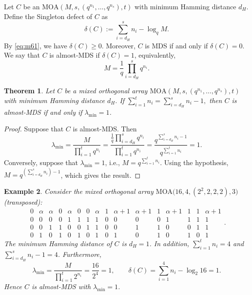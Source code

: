 \documentclass[11pt]{article}
\newtheorem{Theorem}{Theorem}[section]
\newtheorem{Example}[Theorem]{Example}
\newtheorem{Definition and Notation}[Theorem]{Definition and Notation}
\begin{document}
Let $C$ be an $\mathrm{MOA}(M,s,(q^{n_1},\dots,q^{n_s}),t)$ with minimum Hamming distance $d_H$. Define the Singleton defect of $C$ as
\begin{equation}
\delta(C) := \sum_{i=d_H}^s n_i - \log_q M.
\end{equation}
By \eqref{eq:m61}, we have $\delta(C)\ge 0$. Moreover, $C$ is MDS  if and only if $\delta(C) = 0$. We say that $C$ is almost-MDS if $\delta(C) = 1$, equivalently,
\begin{equation}
M = \frac{1}{q} \prod_{i=d_H}^{s} q^{n_i}.
\end{equation}

\begin{Theorem}\label{th:nearcon}
Let $C$ be a mixed orthogonal array $\mathrm{MOA}(M,s,(q^{n_1},\dots,q^{n_s}),t)$ with minimum Hamming distance $d_H$. If $ \sum_{i=1}^{t}n_i=\sum_{i=d_H}^{s}n_i-1,$ then $C$ is almost-MDS if and only if $\lambda_{\min}= 1$.
\end{Theorem}

\begin{proof}
Suppose that $C$ is almost-MDS. Then
$$
\lambda_{\min}=\frac{M}{\prod_{i=1}^{t} q^{n_i}}=\frac{\frac{1}{q} \prod_{i=d_H}^{s} q^{n_i}}{\prod_{i=1}^{t} q^{n_i}}=\frac{q^{\sum_{i=d_H}^{s}n_i-1}}{q^{\sum_{i=1}^{t}n_i}}=1.
$$
Conversely, suppose that $\lambda_{\min}=1$, i.e., $M=q^{\sum_{i=1}^{t}n_i}$. Using the hypothesis, $M = q^{(\sum_{i=d_H}^{s}n_i) - 1}$, which gives the result.
\end{proof}

\begin{Example}\label{ex:nearMDS}
Consider the mixed orthogonal array $\mathrm{MOA}\bigl(16,4,(2^2,2,2,2),3\bigr)$ (transposed):
$$
\begin{array}{cccccccccccccccc}
0 & \alpha & \alpha & 0 & \alpha & 0 & 0 & \alpha & 1 & \alpha+1 & \alpha+1 & 1 & \alpha+1 & 1 & 1 & \alpha+1 \\
0 & 0 & 0 & 0 & 1 & 1 & 1 & 1 & 0 & 0 & 0 & 0 & 1 & 1 & 1 & 1 \\
0 & 0 & 1 & 1 & 0 & 0 & 1 & 1 & 0 & 0 & 1 & 1 & 0 & 0 & 1 & 1 \\
0 & 1 & 0 & 1 & 0 & 1 & 0 & 1 & 0 & 1 & 0 & 1 & 0 & 1 & 0 & 1
\end{array}.
$$
The minimum Hamming distance of $C$ is $d_H=1$. In addition, $\sum_{i=1}^t n_i =4$ and $\sum_{i=d_H}^{s} n_i -1=4$. Furthermore,
$$
\lambda_{\min}=\frac{M}{\prod_{i=1}^{t}2^{n_i}}=\frac{16}{2^{4}}=1,
\qquad
\delta(C)=\sum_{i=1}^4 n_i-\log_2 16=1.
$$
Hence $C$ is almost-MDS with $\lambda_{\min}=1$.
\end{Example}
\end{document}
